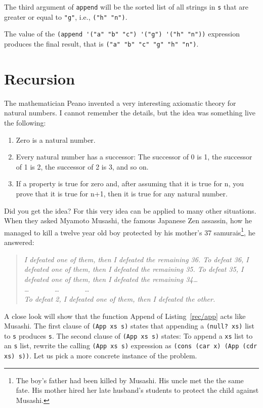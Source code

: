 \documentclass[a4paper,12pt]{book}
\begin{document}
The third argument of \verb|append| will
be the sorted list of all strings in \verb|s|
that are greater or equal to \verb|"g"|,
i.e., \verb|("h" "n")|.

The value of the \verb|(append '("a" "b" "c") '("g") '("h" "n"))|
expression produces the final result, that is
\verb|("a" "b" "c" "g" "h" "n")|.

\chapter{Recursion}\label{chapter:Recursion}
The mathematician Peano invented a very interesting axiomatic theory for
natural numbers. I cannot remember the details, but the idea was
something live the following:
\begin{enumerate}
\item Zero is a natural number.
\item Every natural number has a successor: The successor of 0 is 1, the
successor of 1 is 2, the successor of 2 is 3, and so on.
\item If a property is true for zero and, after assuming that it is true for n,
you prove that it is true for n+1, then it is true for any natural number.
\end{enumerate}
Did you get the idea? For this very idea can be applied to many other
situations. When they asked Myamoto Musashi, the famous Japanese
Zen assassin, how he managed to kill a twelve year old boy protected by his
mother's 37 samurais\footnote{The boy's father had been killed by Musashi. His uncle met the the same fate. His
mother  hired her late husband's students to protect the child against Musashi.}, he answered:
\begin{quote} \em
I defeated one of them, then I defeated
the remaining 36. To defeat 36, I defeated one of them, then I defeated
the remaining 35. To defeat 35, I defeated one of them, then I defeated the
remaining 34\ldots \\
\ldots~~~~~~~\ldots~~~~~~~\ldots\\
To defeat 2, I defeated one of them, then I defeated the other.
\end{quote}
A close look will show that 
the function 
Append of Listing~\ref{rec/app} acts like
Musashi. The first
clause of \verb|(App xs s)| states that
appending a \verb|(null? xs)| list to
\verb|s| produces \verb|s|. The second 
clause of \verb|(App xs s)|  states: To
append a \verb|xs| list to an \verb|s| list,
rewrite the calling 
\verb|(App xs s)| expression
as \verb|(cons (car x) (App (cdr xs) s))|.
Let us pick a more concrete instance of the problem.
\end{document}
